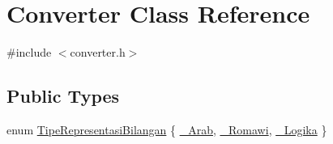 \hypertarget{class_converter}{\section{Converter Class Reference}
\label{class_converter}
}


{\ttfamily \#include $<$converter.\-h$>$}

\subsection*{Public Types}
\begin{DoxyCompactItemize}
\item 
enum \hyperlink{class_converter_a1caaefa1f3fba463bd215e8e7f12872f}{Tipe\-Representasi\-Bilangan} \{ \hyperlink{class_converter_a1caaefa1f3fba463bd215e8e7f12872fa42f9bbd983a4ccdf72f2fc2bfe26efe7}{\-\_\-\-Arab}, 
\hyperlink{class_converter_a1caaefa1f3fba463bd215e8e7f12872faab56d50b2561f79548c4fc6e700d7005}{\-\_\-\-Romawi}, 
\hyperlink{class_converter_a1caaefa1f3fba463bd215e8e7f12872fa5688eeb94a505273115a1f2f75d40212}{\-\_\-\-Logika}
 \}
\end{DoxyCompactItemize}

